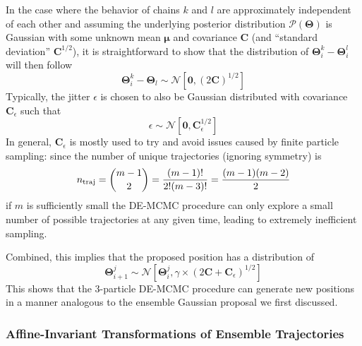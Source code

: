 \documentclass[12pt, titlepage]{article}
\newcommand{\Normal}[2]{\ensuremath{\mathcal{N}\left[{#1}, {#2} \right]}} %
\newcommand{\params}{\ensuremath{\boldsymbol\Theta}}
\newcommand{\posterior}{\ensuremath{\mathcal{P}}}
\newcommand{\cov}{\ensuremath{\mathbf{C}}}
\newcommand{\meanvec}{\ensuremath{\boldsymbol{\mu}}}
\begin{document}
In the case where the behavior of chains $k$ and $l$ are approximately
independent of each other and assuming the
underlying posterior distribution $\posterior(\params)$
is Gaussian with some unknown
mean $\meanvec$ and covariance $\cov$
(and ``standard deviation'' $\cov^{1/2}$), it is straightforward to
show that the distribution of $\params^k_i - \params^l_i$ will then follow
\begin{equation}
    \params^k_i - \params_l \sim \Normal{\mathbf{0}}{(2\cov)^{1/2}}
\end{equation}
Typically, the jitter $\epsilon$ is chosen to also be Gaussian distributed
with covariance $\cov_\epsilon$ such that
\begin{equation}
    \epsilon \sim \Normal{\mathbf{0}}{\cov_\epsilon^{1/2}}
\end{equation}
In general, $\cov_\epsilon$ is mostly
used to try and avoid issues caused by finite particle
sampling: since the number of unique trajectories (ignoring symmetry) is
\begin{equation*}
    n_{\rm traj} 
    = \binom{m-1}{2} 
    = \frac{(m-1)!}{2!(m-3)!}
    = \frac{(m-1)(m-2)}{2}
\end{equation*}
if $m$ is sufficiently small the DE-MCMC
procedure can only explore a small number of possible trajectories
at any given time, leading to extremely inefficient sampling.

Combined, this implies that the
proposed position has a distribution of
\begin{equation}
    \params_{i+1}^{j} 
    \sim \Normal{\params_i^j}{\gamma \times (2\cov+\cov_\epsilon)^{1/2}}
\end{equation}
This shows that the 3-particle DE-MCMC procedure can generate
new positions in a manner analogous to the ensemble Gaussian proposal
we first discussed.

\subsubsection{Affine-Invariant Transformations of Ensemble Trajectories}
\label{subsubsec:emcee}
\end{document}
